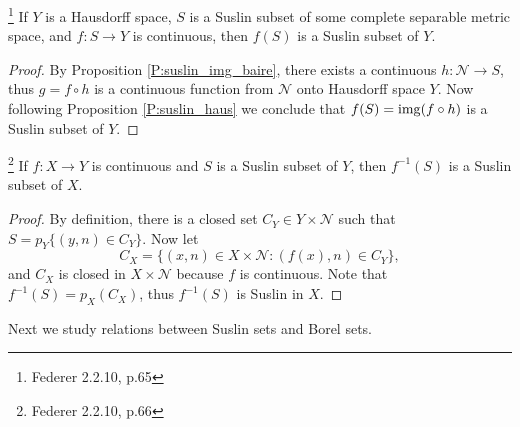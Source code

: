 \begin{corollary} \label{C:suslin_cont_img}
\footnote{Federer 2.2.10, p.65}
If $Y$ is a Hausdorff space, $S$ is a Suslin subset of some complete separable 
metric space, and $f:S\to Y$ is continuous, then $f(S)$ is a Suslin subset of
$Y$.
\end{corollary}
\begin{proof}
By Proposition \ref{P:suslin_img_baire}, there exists a continuous
$h:\mathcal{N}\to S$, thus $g=f\circ h$ is a continuous function from
$\mathcal{N}$ onto Hausdorff space $Y$. Now following Proposition
\ref{P:suslin_haus} we conclude that $f(S)=\operatorname*{img} (f\circ h)$ is a Suslin subset
of $Y$.
\end{proof}

\begin{corollary} \label{C:suslin_cont_preimg}
  \footnote{Federer 2.2.10, p.66}
	If $f:X\to Y$ is continuous and $S$ is a Suslin subset of $Y$, then
	$f^{-1}(S)$ is a Suslin subset of $X$.
\end{corollary}
\begin{proof}
	By definition, there is a closed set $C_Y\in Y\times\mathcal{N}$ such that
	$S=p_Y\{(y,n)\in C_Y\}$. Now let
	\[
		C_X = \{(x,n)\in X\times\mathcal{N}: (f(x),n)\in C_Y\},
	\]
  and $C_X$ is closed in $X\times\mathcal{N}$ because $f$ is continuous.
	Note that $f^{-1}(S)=p_X(C_X)$, thus $f^{-1}(S)$ is Suslin in $X$. 
\end{proof}

Next we study relations between Suslin sets and Borel sets. 

